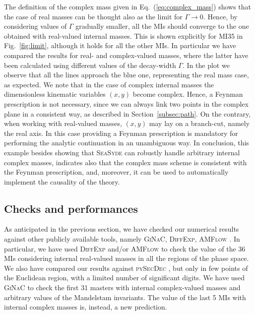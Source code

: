 \documentclass[final,1p,times]{elsarticle}
\begin{document}
The definition of the complex mass given in Eq.~(\ref{eq:complex_mass}) shows that the case of real masses can be thought also as the limit for $\Gamma\to0$. Hence, by considering values of $\Gamma$ gradually smaller, all the MIs should converge to the one obtained with real-valued internal masses. This is shown explicitly for MI35 in Fig.~\ref{fig:limit}, although it holds for all the other MIs. In particular we have compared the results for real- and complex-valued masses, where the latter have been calculated using different values of the decay-width $\Gamma$. In the plot we observe that all the lines approach the blue one, representing the real mass case, as expected.
We note that in the case of complex internal masses the dimensionless kinematic variables $(x,y)$ become complex. Hence, a Feynman prescription is not necessary, since we can always link two points in the complex plane in a consistent way, as described in Section~\ref{subsec:path}. On the contrary, when working with real-valued masses, $(x,y)$ may lay on a branch-cut, namely the real axis. In this case providing a Feynman prescription is mandatory for performing the analytic continuation in an unambiguous way. In conclusion, this example besides showing that \textsc{SeaSyde} can robustly handle arbitrary internal complex masses, indicates also that the complex mass scheme is consistent with the Feynman prescription, and, moreover, it can be used to automatically implement the causality of the theory.



\subsection{Checks and performances}

As anticipated in the previous section, we have checked our numerical results against other publicly available tools, namely \textsc{GiNaC}, \textsc{DiffExp}, \textsc{AMFlow} \cite{Liu:2022chg}. In particular, we have used \textsc{DiffExp} and/or \textsc{AMFlow} to check the value of the 36 MIs considering internal real-valued masses in all the regions of the phase space. We also have compared our results against \textsc{pySecDec} \cite{Borowka:2017idc}, but only in few points of the Euclidean region, with a limited number of significant digits.
We have used \textsc{GiNaC} to check the first 31 masters with internal complex-valued masses and arbitrary values of the Mandelstam invariants. The value of the last 5 MIs with internal complex masses is, instead, a new prediction. 
\end{document}
